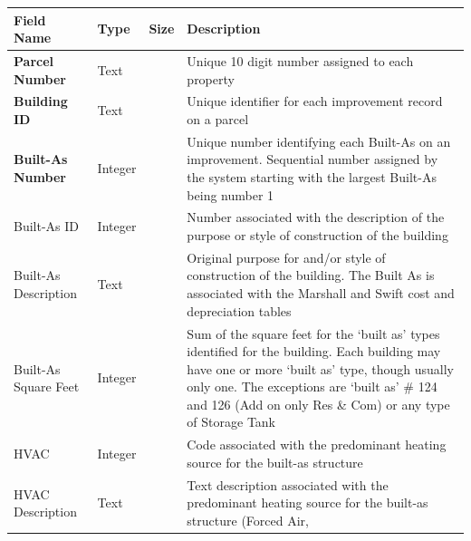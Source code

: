 \documentclass[
  english,
  letterpaper,
  DIV=11,
  numbers=noendperiod]{scrreprt}
\newcounter{none} %
\begin{document}
{\def\LTcaptype{none} %
\begin{longtable}[]{@{}
  >{\raggedright\arraybackslash}p{}
  >{\raggedright\arraybackslash}p{}
  >{\raggedright\arraybackslash}p{}
  >{\raggedright\arraybackslash}p{}@{}}
\toprule\noalign{}
\begin{minipage}[b]{\linewidth}\raggedright
Field Name
\end{minipage} & \begin{minipage}[b]{\linewidth}\raggedright
Type
\end{minipage} & \begin{minipage}[b]{\linewidth}\raggedright
Size
\end{minipage} & \begin{minipage}[b]{\linewidth}\raggedright
Description
\end{minipage} \\
\midrule\noalign{}
\endhead
\bottomrule\noalign{}
\endlastfoot
\textbf{Parcel Number} & Text & 10 & Unique 10 digit number assigned to
each property \\
\textbf{Building ID} & Text & 5 & Unique identifier for each improvement
record on a parcel \\
\textbf{Built-As Number} & Integer & & Unique number identifying each
Built-As on an improvement. Sequential number assigned by the system
starting with the largest Built-As being number 1 \\
Built-As ID & Integer & & Number associated with the description of the
purpose or style of construction of the building \\
Built-As Description & Text & 255 & Original purpose for and/or style of
construction of the building. The Built As is associated with the
Marshall and Swift cost and depreciation tables \\
Built-As Square Feet & Integer & & Sum of the square feet for the `built
as' types identified for the building. Each building may have one or
more `built as' type, though usually only one. The exceptions are `built
as' \# 124 and 126 (Add on only Res \& Com) or any type of Storage
Tank \\
HVAC & Integer & & Code associated with the predominant heating source
for the built-as structure \\
HVAC Description & Text & 30 & Text description associated with the
predominant heating source for the built-as structure (Forced Air,

\end{longtable}}
\end{document}
